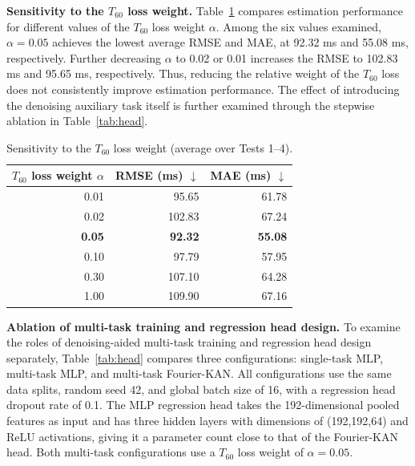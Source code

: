 \documentclass[a4paper,fleqn]{cas-sc}
\begin{document}


\textbf{Sensitivity to the $T_{60}$ loss weight.} Table~\ref{tab:weight} compares estimation performance for different values of the $T_{60}$ loss weight $\alpha$. Among the six values examined, $\alpha=0.05$ achieves the lowest average RMSE and MAE, at 92.32 ms and 55.08 ms, respectively. Further decreasing $\alpha$ to 0.02 or 0.01 increases the RMSE to 102.83 ms and 95.65 ms, respectively. Thus, reducing the relative weight of the $T_{60}$ loss does not consistently improve estimation performance. The effect of introducing the denoising auxiliary task itself is further examined through the stepwise ablation in Table~\ref{tab:head}.



\begin{table}[pos=htbp]
  \centering
  \caption{Sensitivity to the $T_{60}$ loss weight (average over Tests 1--4).}
  \label{tab:weight}
  \small
  \begin{tabular}{rrr}
    \toprule
    $T_{60}$ loss weight $\alpha$ & RMSE (ms) $\downarrow$ & MAE (ms) $\downarrow$ \\
    \midrule
    0.01 & 95.65 & 61.78 \\
    0.02 & 102.83 & 67.24 \\
    \textbf{0.05} & \textbf{92.32} & \textbf{55.08} \\
    0.10 & 97.79 & 57.95 \\
    0.30 & 107.10 & 64.28 \\
    1.00 & 109.90 & 67.16 \\
    \bottomrule
  \end{tabular}
\end{table}



\textbf{Ablation of multi-task training and regression head design.} To examine the roles of denoising-aided multi-task training and regression head design separately, Table~\ref{tab:head} compares three configurations: single-task MLP, multi-task MLP, and multi-task Fourier-KAN. All configurations use the same data splits, random seed 42, and global batch size of 16, with a regression head dropout rate of 0.1. The MLP regression head takes the 192-dimensional pooled features as input and has three hidden layers with dimensions of (192,192,64) and ReLU activations, giving it a parameter count close to that of the Fourier-KAN head. Both multi-task configurations use a $T_{60}$ loss weight of $\alpha=0.05$.
\end{document}
